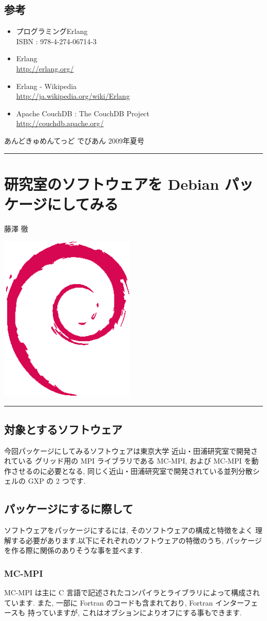 \documentclass[mingoth,a4paper]{jsarticle}
\renewcommand{\dancersection}[2]{%
\newpage
あんどきゅめんてっど でびあん 2009年夏号
%
\vspace{0.1mm}\\
{\color{dancerlightblue}\rule{\hsize}{2mm}}

%
%
\begin{minipage}[t]{0.6\hsize}
\color{dancerdarkblue}
\vspace{1cm}
\section{#1}
\hfill{}#2\\
\end{minipage}
\begin{minipage}[t]{0.4\hsize}
\vspace{-2cm}
\hfill{}\includegraphics[height=8cm]{image200502/openlogo-nd.eps}\\
\vspace{-5cm}
\end{minipage}
%
%
{\color{dancerdarkblue}\rule{0.74\hsize}{2mm}}
%
\vspace{2cm}
}
\begin{document}
\begin{commandline}
\subsection{参考}
\begin{itemize}
 \item プログラミングErlang\\
       ISBN : 978-4-274-06714-3
 \item Erlang\\
       \url{http://erlang.org/}
 \item Erlang - Wikipedia\\
       \url{http://ja.wikipedia.org/wiki/Erlang}
 \item Apache CouchDB : The CouchDB Project\\
       \url{http://couchdb.apache.org/}
\end{itemize}

\dancersection{研究室のソフトウェアを Debian パッケージにしてみる}{藤澤 徹}

\subsection{対象とするソフトウェア}

今回パッケージにしてみるソフトウェアは東京大学 近山・田浦研究室で開発されている
グリッド用の MPI ライブラリである MC-MPI,
および MC-MPI を動作させるのに必要となる,
同じく近山・田浦研究室で開発されている並列分散シェルの GXP の 2 つです.

\subsection{パッケージにするに際して}

ソフトウェアをパッケージにするには, そのソフトウェアの構成と特徴をよく
理解する必要があります.以下にそれぞれのソフトウェアの特徴のうち,
パッケージを作る際に関係のありそうな事を並べます.

\subsubsection{MC-MPI}

MC-MPI は主に C 言語で記述されたコンパイラとライブラリによって構成されています.
また, 一部に Fortran のコードも含まれており, Fortran インターフェースも
持っていますが, これはオブションによりオフにする事もできます.


\end{commandline}
\end{document}
